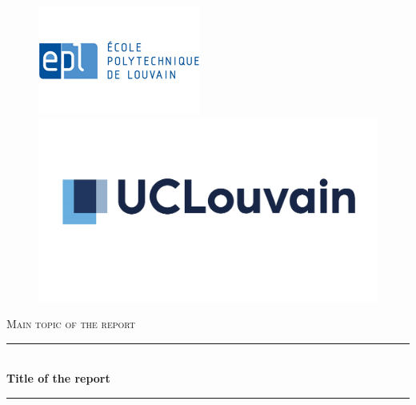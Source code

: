\documentclass{article} %
\begin{document}
\thispagestyle{fancy}

\begin{titlepage}

  \begin{sffamily}
  
  \begin{center}  
        
        \begin{figure}[h]
            \begin{minipage}[c]{0.5\textwidth}
            \flushleft
            \includegraphics[scale=0.8]{logo_epl.jpg}
            \end{minipage}%
            \begin{minipage}[c]{0.5\textwidth}
            \includegraphics[scale=0.37]{logo_ucl.jpg}
            \flushright 
            \end{minipage}
        \end{figure}
        
\vfill

        \textsc{\LARGE Main topic of the report}\\[0.3cm]
        \rule{16cm}{1pt}
        \medskip
        \\
        { \huge \rm \bf Title of the report \\[0.2cm] }
        \rule{16cm}{1pt}
        \\
    
        \vspace{1cm}
    

\end{center}
\end{sffamily}
\end{titlepage}
\end{document}
